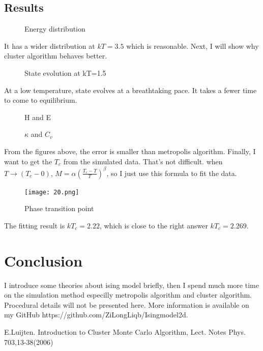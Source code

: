 \documentclass[UTF-8]{article}
\begin{document}
\subsection{Results}
\begin{figure}[H]
	\centering
	\caption{Energy distribution}
\end{figure}
It has a wider distribution at $kT=3.5$ which is reasonable. Next, I will show why cluster algorithm behaves better.
\begin{figure}[H]
	\centering
	\caption{State evolution at kT=1.5}
\end{figure}
At a low temperature, state evolves at a breathtaking pace. It takes a fewer time to come to equilibrium.
\begin{figure}[H]
	\centering
	\caption{H and E}
\end{figure}
\begin{figure}[H]
	\centering
	\caption{$\kappa$ and $C_v$}
\end{figure}
From the figures above, the error is smaller than metropolis algorithm. Finally, I want to get the $T_c$ from the simulated data. That's not difficult. when $T\rightarrow (T_c-0)$, $M=\alpha(\frac{T_c-T}{T})^\beta$, so I just use this formula to fit the data.
\begin{figure}[H]
	\centering
	\texttt{[image: 20.png]}
	\caption{Phase transition point}
\end{figure}
The fitting result is $kT_c=2.22$, which is close to the right answer $kT_c=2.269$.
\section{Conclusion}
I introduce some theories about ising model briefly, then I spend much more time on the simulation method  especilly metropolis algorithm and cluster algorithm. Procedural details will not be presented here. More information is available on my GitHub https://github.com/ZiLongLiqb/Isingmodel2d.
\begin{thebibliography}{1}
 E.Luijten. Introduction to Cluster Monte Carlo Algorithm, Lect. Notes Phys. 703,13-38(2006)
\end{thebibliography}
\end{document}
